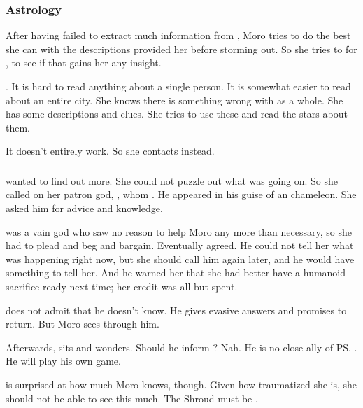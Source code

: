 \subsubsection{Astrology}
After having failed to extract much information from \Tiroco, Moro tries to do the best she can with the descriptions \Tiroco{} provided her before storming out. 
So she tries to  for \Tiroco, to see if that gains her any insight. 

. 
It is hard to read anything about a single person. 
It is somewhat easier to read about an entire city. 
She knows there is something wrong with \Malcur as a whole. 
She has some descriptions and clues. 
She tries to use these and read the stars about them. 

It doesn't entirely work. 
So she contacts \Nasshikerr{} instead. 





\subsubsection{\Nasshikerr}
\MoroCobrel{} wanted to find out more. 
She could not puzzle out what was going on. 
So she called on her patron god, , whom .
He appeared in his guise of an chameleon.  
She asked him for advice and knowledge. 

\Nasshikerr{} was a vain god who saw no reason to help Moro any more than necessary, so she had to plead and beg and bargain. 
Eventually \Nasshikerr{} agreed. 
He could not tell her what was happening right now, but she should call him again later, and he would have something to tell her. 
And he warned her that she had better have a humanoid sacrifice ready next time; her credit was all but spent. 

\Nasshikerr{} does not admit that he doesn't know. 
He gives evasive answers and promises to return. 
But Moro sees through him. 

Afterwards, \Nasshikerr{} sits and wonders. 
Should he inform \Secherdamon? 
Nah. 
He is no close ally of \ps{\Secherdamon}. 
He will play his own game. 

\Nasshikerr{} is surprised at how much Moro knows, though. 
Given how traumatized she is, she should not be able to see this much. 
The Shroud must be . 

